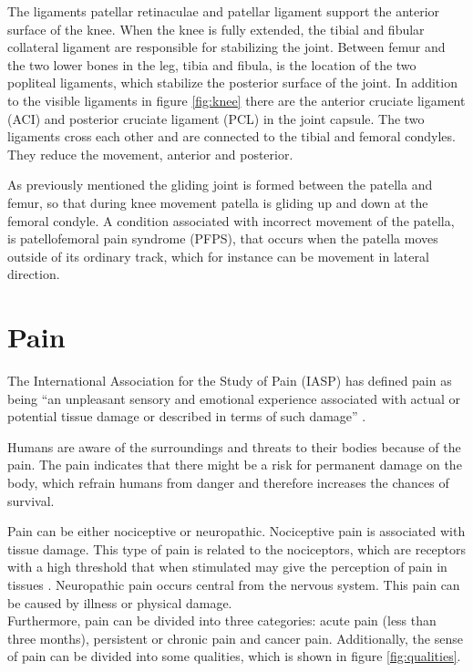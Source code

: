 \noindent
The ligaments patellar retinaculae and patellar ligament support the anterior surface of the knee. When the knee is fully extended, the tibial and fibular collateral ligament are responsible for stabilizing the joint. Between femur and the two lower bones in the leg, tibia and fibula, is the location of the two popliteal ligaments, which stabilize the posterior surface of the joint. In addition to the visible ligaments in figure \ref{fig:knee} there are the anterior cruciate ligament (ACI) and posterior cruciate ligament (PCL) in the joint capsule. The two ligaments cross each other and are connected to the tibial and femoral condyles. They reduce the movement, anterior and posterior.\citep{Martini2012}

As previously mentioned the gliding joint is formed between the patella and femur, so that during knee movement patella is gliding up and down at the femoral condyle. A condition associated with incorrect movement of the patella, is patellofemoral pain syndrome (PFPS), that occurs when the patella moves outside of its ordinary track, which for instance can be movement in lateral direction.\citep{Martini2012}


\section{Pain}

The International Association for the Study of Pain (IASP) has defined pain as being “an unpleasant sensory and emotional experience associated with actual or potential tissue damage or described in terms of such damage” \citep{IASP2012, Schmidt1989}.

\noindent
Humans are aware of the surroundings and threats to their bodies because of the pain. The pain indicates that there might be a risk for permanent damage on the body, which refrain humans from danger and therefore increases the chances of survival. 


\noindent
Pain can be either nociceptive or neuropathic. Nociceptive pain is associated with tissue damage. This type of pain is related to the nociceptors, which are receptors with a high threshold that when stimulated may give the perception of pain in tissues \citep{Schmidt2013}. Neuropathic pain occurs central from the nervous system. This pain can be caused by illness or physical damage. \\


\noindent
Furthermore, pain can be divided into three categories: acute pain (less than three months), persistent or chronic pain and cancer pain.\citep{Briggs2010} Additionally, the sense of pain can be divided into some qualities, which is shown in figure \ref{fig:qualities}. 

